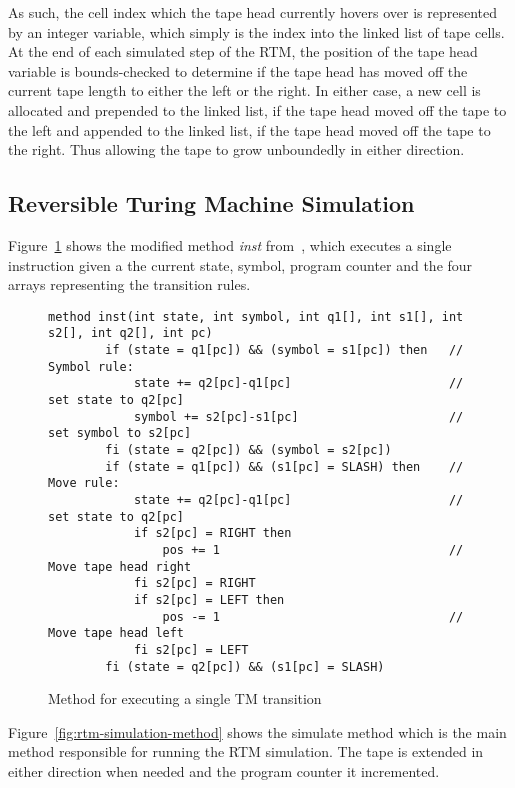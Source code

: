 As such, the cell index which the tape head currently hovers over is represented by an integer variable, which simply is the index into the linked list of tape cells. At the end of each simulated step of the RTM, the position of the tape head variable is bounds-checked to determine if the tape head has moved off the current tape length to either the left or the right. In either case, a new cell is allocated and prepended to the linked list, if the tape head moved off the tape to the left and appended to the linked list, if the tape head moved off the tape to the right. Thus allowing the tape to grow unboundedly in either direction.

\subsection{Reversible Turing Machine Simulation}
\label{subsec:rtm-simulation}
Figure~\ref{fig:rtm-instruction-method} shows the modified method \textit{inst} from~\cite{ty:ejanus}, which executes a single instruction given a the current state, symbol, program counter and the four arrays representing the transition rules. 

\begin{figure}[ht]
    \centering
    \begin{lstlisting}[style = basic, language = roopl]
    method inst(int state, int symbol, int q1[], int s1[], int s2[], int q2[], int pc)
        if (state = q1[pc]) && (symbol = s1[pc]) then   // Symbol rule:
            state += q2[pc]-q1[pc]                      // set state to q2[pc]
            symbol += s2[pc]-s1[pc]                     // set symbol to s2[pc]
        fi (state = q2[pc]) && (symbol = s2[pc])
        if (state = q1[pc]) && (s1[pc] = SLASH) then    // Move rule:
            state += q2[pc]-q1[pc]                      // set state to q2[pc]
            if s2[pc] = RIGHT then
                pos += 1                                // Move tape head right
            fi s2[pc] = RIGHT
            if s2[pc] = LEFT then
                pos -= 1                                // Move tape head left
            fi s2[pc] = LEFT
        fi (state = q2[pc]) && (s1[pc] = SLASH)
    \end{lstlisting}
    \caption{Method for executing a single TM transition}
    \label{fig:rtm-instruction-method}
\end{figure}

Figure~\ref{fig:rtm-simulation-method} shows the simulate method which is the main method responsible for running the RTM simulation. The tape is extended in either direction when needed and the program counter it incremented.

